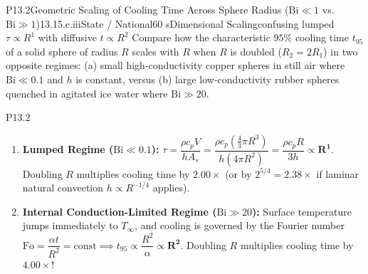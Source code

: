 \begin{problem}{P13.2}{Geometric Scaling of Cooling Time Across Sphere Radius ($\mathrm{Bi} \ll 1$ vs.\ $\mathrm{Bi} \gg 1$)}{13.1}{5.c.iii}{State / National}{60 s}{Dimensional Scaling}{confusing lumped $\tau \propto R^1$ with diffusive $t \propto R^2$}
Compare how the characteristic $95\%$ cooling time $t_{95}$ of a solid sphere of radius $R$ scales with $R$ when $R$ is doubled ($R_2 = 2R_1$) in two opposite regimes: (a) small high-conductivity copper spheres in still air where $\mathrm{Bi} \ll 0.1$ and $h$ is constant, versus (b) large low-conductivity rubber spheres quenched in agitated ice water where $\mathrm{Bi} \gg 20$.
\end{problem}
\begin{solution}{P13.2}
\begin{enumerate}
  \item[(a)] \textbf{Lumped Regime ($\mathrm{Bi} \ll 0.1$):} $\tau = \dfrac{\rho c_p V}{h A_s} = \dfrac{\rho c_p (\frac{4}{3}\pi R^3)}{h (4\pi R^2)} = \dfrac{\rho c_p R}{3 h} \propto \mathbf{R^1}$. Doubling $R$ multiplies cooling time by $\mathbf{2.00\times}$ (or by $2^{5/4} = 2.38\times$ if laminar natural convection $h \propto R^{-1/4}$ applies).
  \item[(b)] \textbf{Internal Conduction-Limited Regime ($\mathrm{Bi} \gg 20$):} Surface temperature jumps immediately to $T_\infty$, and cooling is governed by the Fourier number $\mathrm{Fo} = \dfrac{\alpha t}{R^2} = \mathrm{const} \implies t_{95} \propto \dfrac{R^2}{\alpha} \propto \mathbf{R^2}$. Doubling $R$ multiplies cooling time by $\mathbf{4.00\times}$!
\end{enumerate}
\end{solution}


